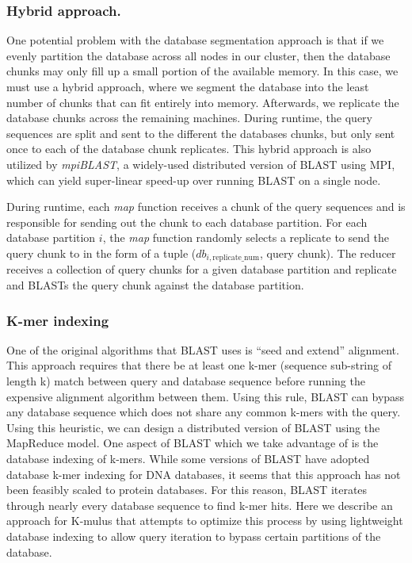 \subsubsection{Hybrid approach.}
One potential problem with the database segmentation approach is that if we evenly partition the database across all nodes in our cluster, then the database chunks may only fill up a small portion of the available memory.
In this case, we must use a hybrid approach, where we segment the database into the least number of chunks that can fit entirely into memory.
Afterwards, we replicate the database chunks across the remaining machines.
During runtime, the query sequences are split and sent to the different the databases chunks, but only sent once to each of the database chunk replicates.
This hybrid approach is also utilized by \emph{mpiBLAST}\cite{darling2003design}, a widely-used distributed version of BLAST using MPI, which can yield super-linear speed-up over running BLAST on a single node.

During runtime, each \emph{map} function receives a chunk of the query sequences and is responsible for sending out the chunk to each database partition.
For each database partition $i$, the \emph{map} function randomly selects a replicate to send the query chunk to in the form of a tuple ($db_{i,\text{replicate\_num}}$, query chunk).
The reducer receives a collection of query chunks for a given database partition and replicate and BLASTs the query chunk against the database partition.

\subsubsection{K-mer indexing}
One of the original algorithms that BLAST uses is ``seed and extend'' alignment. This approach requires that there be at least one k-mer (sequence sub-string of length k) match between query and database sequence before running the expensive alignment algorithm between them\cite{altschul1990basic}. Using this rule, BLAST can bypass any database sequence which does not share any common k-mers with the query. Using this heuristic, we can design a distributed version of BLAST using the MapReduce model. One aspect of BLAST which we take advantage of is the database indexing of k-mers. While some versions of BLAST have adopted database k-mer indexing for DNA databases, it seems that this approach has not been feasibly scaled to protein databases\cite{morgulis2008database}. For this reason, BLAST iterates through nearly every database sequence to find k-mer hits. Here we describe an approach for K-mulus that attempts to optimize this process by using lightweight database indexing to allow query iteration to bypass certain partitions of the database.

